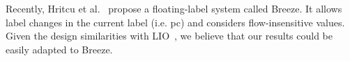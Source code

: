 


Recently, Hritcu et al.~\citep{10.1109/SP.2013.10} propose a floating-label
system called Breeze. It allows label changes in the current label (i.e. pc) and
considers flow-insensitive values. Given the design similarities with
LIO~\citep{stefan:lio}, we believe that our results could be easily adapted to
Breeze.

